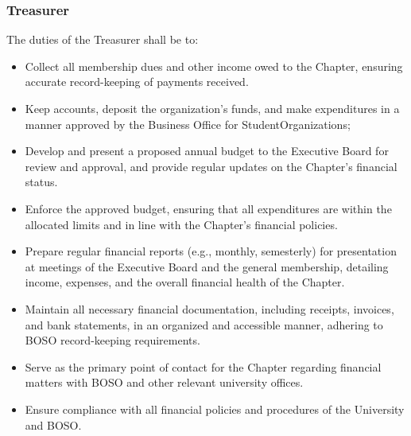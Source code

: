 \documentclass[10pt, oneside]{article}
\begin{document}
\subsubsection{Treasurer}
The duties of the Treasurer shall be to:
\begin{itemize}
    \item Collect all membership dues and other income owed to the Chapter, ensuring accurate record-keeping of payments received.
    \item Keep accounts, deposit the organization’s funds, and make expenditures in a manner approved by the Business Office for StudentOrganizations;
    \item Develop and present a proposed annual budget to the Executive Board for review and approval, and provide regular updates on the Chapter's financial status.
    \item Enforce the approved budget, ensuring that all expenditures are within the allocated limits and in line with the Chapter's financial policies.
    \item Prepare regular financial reports (e.g., monthly, semesterly) for presentation at meetings of the Executive Board and the general membership, detailing income, expenses, and the overall financial health of the Chapter.
    \item Maintain all necessary financial documentation, including receipts, invoices, and bank statements, in an organized and accessible manner, adhering to BOSO record-keeping requirements.
    \item Serve as the primary point of contact for the Chapter regarding financial matters with BOSO and other relevant university offices.
    \item Ensure compliance with all financial policies and procedures of the University and BOSO.
\end{itemize}
\end{document}
